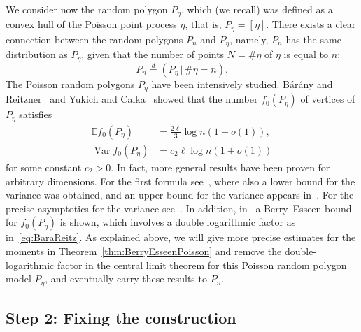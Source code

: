\documentclass[10pt]{amsart}
\theoremstyle{definition}\newtheorem{defi}[theo]{Definition}\newtheorem{rema}[theo]{Remark}\newtheorem{exam}[theo]{Example}\newtheorem{exem}[theo]{Example}\newtheorem{nota}[theo]{Notation}
\newcommand{\var}{\operatorname{Var}}
\newcommand{\bbE}{\mathbb{E}}
\begin{document}
We consider now the random polygon $P_{\eta}$, which (we recall) was defined as a convex hull of the Poisson point process $\eta$, that is, $P_{\eta}=[\eta]$. There exists a clear connection between the random polygons $P_n$ and $P_{\eta}$, namely, $P_n$ has the same distribution as $P_\eta$, given that the number of points $N=\#\eta$ of $\eta$ is equal to $n$:
\[
P_n\stackrel{d}{=}(P_{\eta}\,|\,\#\eta = n).
\]
The Poisson random polygons $P_{\eta}$ have been intensively studied. Bárány and Reitzner~\cite{BR10} and Yukich and Calka~\cite{CY17} showed that the number $f_0(P_\eta)$ of vertices of $P_\eta$ satisfies
\begin{align*}
\bbE f_0(P_{\eta})&=\frac{2 \ell}{3} \log n (1+o(1)),
\\
\var f_0(P_{\eta})&= c_2 \ell \log n (1+o(1))
\end{align*}
for some constant $c_2>0$. In fact, more general results have been proven for arbitrary dimensions. For the first formula see~\cite[Theorem~1.2]{BR10}, where also a lower bound for the variance was obtained, and an upper bound for the variance appears in~\cite[Theorem~1.1]{BR10a}. For the precise asymptotics for the variance see~\cite[Theorem~1.3]{CY17}. In addition, in~\cite{BR10a} a Berry--Esseen bound for $f_0(P_\eta)$ is shown, which involves a double logarithmic factor as in~\eqref{eq:BaraReitz}. As explained above, we will give more precise estimates for the moments in Theorem~\ref{thm:BerryEsseenPoisson} and remove the double-logarithmic factor in the central limit theorem for this Poisson random polygon model $P_\eta$, and eventually carry these results to $P_n$.


\subsection{Step 2: Fixing the construction}\label{step2}
\end{document}
